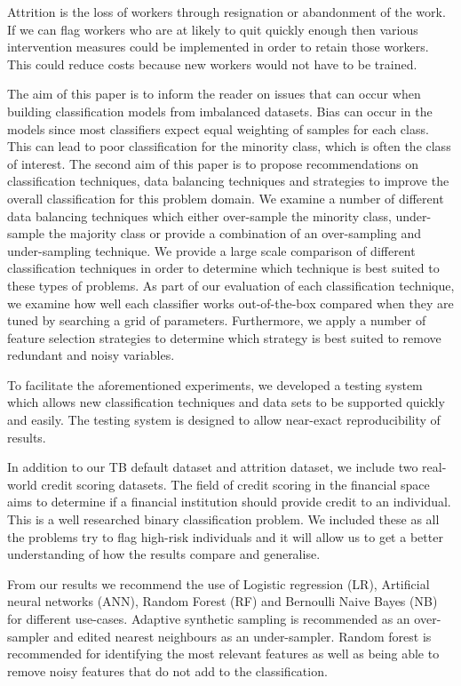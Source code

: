 \documentclass{sig-alternate-05-2015}
\begin{document}
	Attrition is the loss of workers through resignation or abandonment of the work. If we can flag workers who are at likely to quit quickly enough then various intervention measures could be implemented in order to retain those workers. This could reduce costs because new workers would not have to be trained.
	
	The aim of this paper is to inform the reader on issues that can occur when building classification models from imbalanced datasets. Bias can occur in the models since most classifiers expect equal weighting of samples for each class. This can lead to poor classification for the minority class, which is often the class of interest. The second aim of this paper is to propose recommendations on classification techniques, data balancing techniques and strategies to improve the overall classification for this problem domain. We examine a number of different data balancing techniques which either over-sample the minority class, under-sample the majority class or provide a combination of an over-sampling and under-sampling technique. We provide a large scale comparison of different classification techniques in order to determine which technique is best suited to these types of problems. As part of our evaluation of each classification technique, we examine how well each classifier works out-of-the-box compared when they are tuned by searching a grid of parameters. Furthermore, we apply a number of feature selection strategies to determine which strategy is best suited to remove redundant and noisy variables.
	
	To facilitate the aforementioned experiments, we developed a testing system which allows new classification techniques and data sets to be supported quickly and easily. The testing system is designed to allow near-exact reproducibility of results.
	
	In addition to our TB default dataset and attrition dataset, we include two real-world credit scoring datasets. The field of credit scoring in the financial space aims to determine if a financial institution should provide credit to an individual. This is a well researched binary classification problem. We included these as all the problems try to flag high-risk individuals and it will allow us to get a better understanding of how the results compare and generalise.
	
	From our results we recommend the use of Logistic regression (LR), Artificial neural networks (ANN), Random Forest (RF) and Bernoulli Naive Bayes (NB) for different use-cases. Adaptive synthetic sampling is recommended as an over-sampler and edited nearest neighbours as an under-sampler. Random forest is recommended for identifying the most relevant features as well as being able to remove noisy features that do not add to the classification.
	
\end{document}
